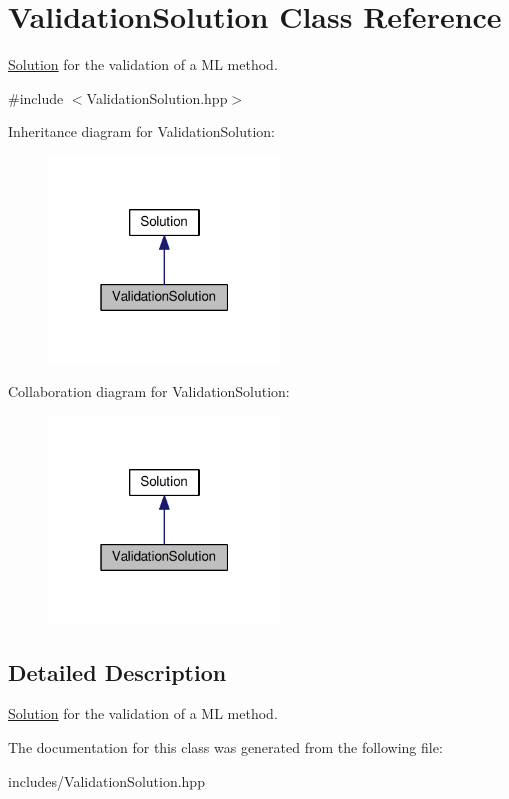 \hypertarget{class_validation_solution}{}\section{Validation\+Solution Class Reference}
\label{class_validation_solution}


\hyperlink{class_solution}{Solution} for the validation of a ML method.  




{\ttfamily \#include $<$Validation\+Solution.\+hpp$>$}



Inheritance diagram for Validation\+Solution\+:\nopagebreak
\begin{figure}[H]
\begin{center}
\leavevmode
\includegraphics[width=175pt]{class_validation_solution__inherit__graph}
\end{center}
\end{figure}


Collaboration diagram for Validation\+Solution\+:\nopagebreak
\begin{figure}[H]
\begin{center}
\leavevmode
\includegraphics[width=175pt]{class_validation_solution__coll__graph}
\end{center}
\end{figure}


\subsection{Detailed Description}
\hyperlink{class_solution}{Solution} for the validation of a ML method. 

The documentation for this class was generated from the following file\+:\begin{DoxyCompactItemize}
\item 
includes/Validation\+Solution.\+hpp\end{DoxyCompactItemize}
